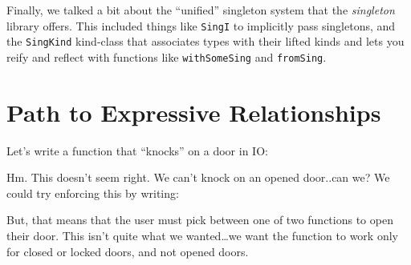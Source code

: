 \documentclass[]{article}
\newenvironment{Shaded}{}{}
\newcommand{\DataTypeTok}[1]{\textcolor[rgb]{0.56,0.13,0.00}{#1}}
\newcommand{\FunctionTok}[1]{\textcolor[rgb]{0.02,0.16,0.49}{#1}}
\newcommand{\NormalTok}[1]{#1}
\newcommand{\OtherTok}[1]{\textcolor[rgb]{0.00,0.44,0.13}{#1}}
\newcommand{\StringTok}[1]{\textcolor[rgb]{0.25,0.44,0.63}{#1}}
\begin{document}
Finally, we talked a bit about the ``unified'' singleton system that the
\emph{singleton} library offers. This included things like \texttt{SingI} to
implicitly pass singletons, and the \texttt{SingKind} kind-class that associates
types with their lifted kinds and lets you reify and reflect with functions like
\texttt{withSomeSing} and \texttt{fromSing}.

\hypertarget{path-to-expressive-relationships}{%
\section{Path to Expressive
Relationships}\label{path-to-expressive-relationships}}

Let's write a function that ``knocks'' on a door in IO:

\begin{Shaded}
\end{Shaded}

Hm. This doesn't seem right. We can't knock on an opened door..can we? We could
try enforcing this by writing:

\begin{Shaded}
\end{Shaded}

But, that means that the user must pick between one of two functions to open
their door. This isn't quite what we wanted\ldots{}we want the function to work
only for closed or locked doors, and not opened doors.
\end{document}
